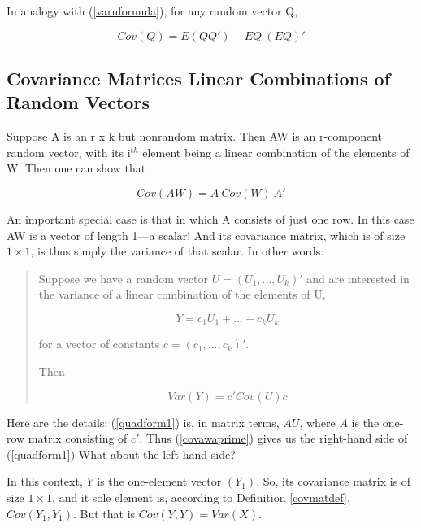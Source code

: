 In analogy with (\ref{varuformula}), for any
random vector Q,

\begin{equation}
\label{quickcovarmat}
Cov(Q) = E(Q Q') - EQ ~ (EQ)'
\end{equation}

\subsection{Covariance Matrices Linear Combinations of Random Vectors}

Suppose A is an r x k but nonrandom matrix.  Then AW is an r-component
random vector, with its i$^{th}$ element being a linear combination of
the elements of W.  Then one can show that

\begin{equation}
\label{covawaprime}
Cov(AW) = A ~ Cov(W)  ~A'
\end{equation}

An important special case is that in which A consists of just one row.
In this case AW is a vector of length 1---a scalar!  And its covariance
matrix, which is of size $1 \times 1$, is thus simply the variance of
that scalar.  In other words:

\begin{quote}

Suppose we have a random vector $U = (U_1,...,U_k)'$ and are interested
in the variance of a linear combination of the elements of U, 

\begin{equation}
\label{quadform1}
Y = c_1 U_1 + ...+ c_k U_k
\end{equation}

for a vector of constants $c = (c_1,...,c_k)'$.

Then

\begin{equation}
\label{quadform2}
Var(Y) =  c'Cov(U) c
\end{equation}

\end{quote}

Here are the details:  (\ref{quadform1}) is, in matrix terms, $AU$,
where $A$ is the one-row matrix consisting of $c'$.  Thus
(\ref{covawaprime}) gives us the right-hand side of (\ref{quadform1})
What about the left-hand side?

In this context, $Y$ is the one-element vector $(Y_1)$.  So, its
covariance matrix is of size $1 \times 1$, and it sole element is,
according to Definition \ref{covmatdef}, $Cov(Y_1,Y_1)$.  But that is
$Cov(Y,Y) = Var(X)$.

